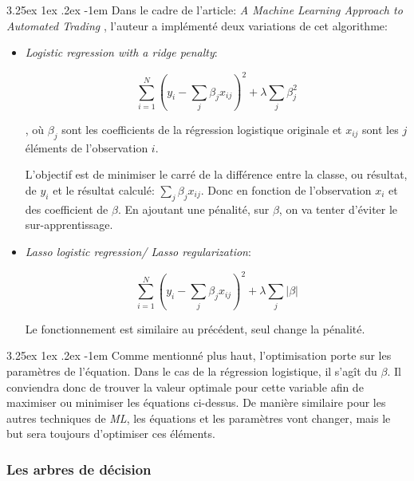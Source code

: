 \documentclass[a4paper, 11pt]{article}
\makeatletter
\renewcommand\paragraph{\@startsection{paragraph}{5}{\z@}%
  {3.25ex \@plus1ex \@minus.2ex}%
  {-1em}%
  {\normalfont\normalsize\bfseries}}
\makeatother
\begin{document}
\paragraph{}
Dans le cadre de l'article: \textit{A Machine Learning Approach to Automated Trading} \cite{machine_learning_automated_trading}, 
l'auteur a implémenté deux variations de cet algorithme:
\begin{itemize}
\item \textit{Logistic regression with a ridge penalty}:
\begin{center}
$$\sum_{i=1}^N (y_i - \sum_j\beta_j x_{ij})^2 + \lambda \sum_j \beta_j^2$$
\end{center}
, où $\beta_j$ sont les coefficients de la régression logistique originale \cite{machine_learning_automated_trading} et $x_{ij}$
sont les $j$ éléments de l'observation $i$.

L'objectif est de minimiser le carré de la différence entre la classe, ou résultat, de $y_i$ et le résultat 
calculé: $\sum\limits_j\beta_j x_{ij}$. Donc en fonction de l'observation $x_i$ et des coefficient de $\beta$.
En ajoutant une pénalité, sur $\beta$, on va tenter d'éviter le sur-apprentissage.

\item \textit{Lasso logistic regression/ Lasso regularization}:
\begin{center}
$$\sum_{i=1}^N (y_i - \sum_j\beta_j x_{ij})^2 + \lambda \sum_j |\beta|$$
\end{center}
Le fonctionnement est similaire au précédent, seul change la pénalité.

\end{itemize}

\paragraph{}
Comme mentionné plus haut, l'optimisation porte sur les paramètres de l'équation. Dans le cas de la régression logistique, 
il s'agît du $\beta$. Il conviendra donc de trouver la valeur optimale pour cette variable afin de maximiser ou minimiser 
les équations ci-dessus. De manière similaire pour les autres techniques de \textit{ML}, 
les équations et les paramètres vont changer, mais  le but sera toujours d'optimiser ces éléments. 

\subsubsection{Les arbres de décision}\label{section arbre de décision}
\end{document}
